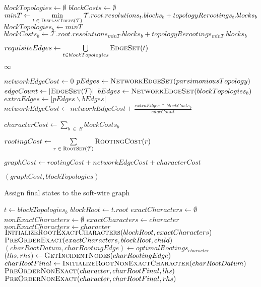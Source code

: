\documentclass[12pt]{article}
\begin{document}
{\begin{algorithm}
\begin{algorithmic}[1]
		\State $blockTopologies \gets \emptyset$
		\State $blockCosts      \gets \emptyset$
		  \State $minT \gets \min\limits_{t\; \in\; \Call{DisplayTrees}{\mathcal{T}}} \mathcal{T}.root.resolutions_{t}.blocks_{b} + topologyRerootings_{t}.blocks_{b}$
          \State $blockTopologies_{b} \gets minT$
          \State $blockCosts_{b}      \gets \mathcal{T}.root.resolutions_{minT}.blocks_{b} + topologyRerootings_{minT}.blocks_{b}$
		\EndFor
		
		\State $requisiteEdges \gets \bigcup\limits_{t \in blockTopologies} \Call{EdgeSet}{t}$
		
		   \State \Return $\infty$
		\EndIf
		
		\State $networkEdgeCost \gets 0$
		\State $pEdges \gets \Call{NetworkEdgeSet}{parsimoniousTopology}$
		\State $edgeCount \gets |\Call{EdgeSet}{\mathcal{T}}|$
		  \State $bEdges \gets \Call{NetworkEdgeSet}{blockTopologies_b}$
		  \State $extraEdges \gets |pEdges \backslash bEdges |$
		  \State $networkEdgeCost \gets networkEdgeCost + \frac{extraEdges \;*\; blockCosts_b}{edgeCount}$
		\EndFor
		
		\State $characterCost \gets \sum\limits_{b\; \in\; B} blockCosts_{b}$
		
		\State $rootingCost \gets \sum\limits_{r\; \in\; \Call{RootSet}{\mathcal{T}}} \Call{RootingCost}{r}$
		
		\State $graphCost \gets rootingCost + networkEdgeCost + characterCost$

		\State \Return $(graphCost, blockTopologies)$
		\EndFunction
	\end{algorithmic}
\end{algorithm}


\begin{algorithm}
	\caption{Assign final states to the soft-wire graph}
	\label{Alg:pre-order-traversal}
	\begin{algorithmic}[1]
		
		  \State $t \gets blockTopologies_{b}$
		  \State $blockRoot \gets t.root$
		  \State $exactCharacters \gets \emptyset$
		  \State $nonExactCharacters \gets \emptyset$
		      \State $exactCharacters \gets character$
		    \Else
		      \State $nonExactCharacters \gets character$
		    \EndIf
		  \EndFor
		  \State $\Call{InitializeRootExactCharacters}{blockRoot, exactCharacters}$
		    \State $\Call{PreOrderExact}{exactCharacters, blockRoot, child}$
		  \EndFor
		    \State $(charRootDatum, charRootingEdge) \gets optimalRootings_{character}$
		    \State $(lhs, rhs) \gets \Call{GetIncidentNodes}{charRootingEdge}$
		    \State $charRootFinal \gets \Call{InitializeRootNonExactCharacter}{charRootDatum}$
		    \State $\Call{PreOrderNonExact}{character, charRootFinal, lhs}$
		    \State $\Call{PreOrderNonExact}{character, charRootFinal, rhs}$
		  \EndFor


\end{algorithmic}
\end{algorithm}}
\end{document}
